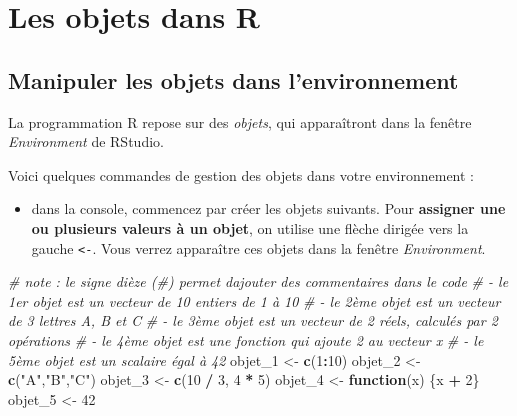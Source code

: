 \documentclass[
]{book}
\newenvironment{Shaded}{\begin{snugshade}}{\end{snugshade}}
\newcommand{\CommentTok}[1]{\textcolor[rgb]{0.56,0.35,0.01}{\textit{#1}}}
\newcommand{\ControlFlowTok}[1]{\textcolor[rgb]{0.13,0.29,0.53}{\textbf{#1}}}
\newcommand{\DecValTok}[1]{\textcolor[rgb]{0.00,0.00,0.81}{#1}}
\newcommand{\FunctionTok}[1]{\textcolor[rgb]{0.13,0.29,0.53}{\textbf{#1}}}
\newcommand{\NormalTok}[1]{#1}
\newcommand{\OtherTok}[1]{\textcolor[rgb]{0.56,0.35,0.01}{#1}}
\newcommand{\SpecialCharTok}[1]{\textcolor[rgb]{0.81,0.36,0.00}{\textbf{#1}}}
\newcommand{\StringTok}[1]{\textcolor[rgb]{0.31,0.60,0.02}{#1}}
\providecommand{\tightlist}{%
  \setlength{\itemsep}{0pt}\setlength{\parskip}{0pt}}
\begin{document}
\chapter{Les objets dans R}\label{les-objets-dans-r}

\section{Manipuler les objets dans l'environnement}\label{manipuler-les-objets-dans-lenvironnement}

La programmation R repose sur des \emph{objets}, qui apparaîtront dans la fenêtre \emph{Environment} de RStudio.

Voici quelques commandes de gestion des objets dans votre environnement :

\begin{itemize}
\tightlist
\item
  dans la console, commencez par créer les objets suivants. Pour \textbf{assigner une ou plusieurs valeurs à un objet}, on utilise une flèche dirigée vers la gauche \texttt{\textless{}-}. Vous verrez apparaître ces objets dans la fenêtre \emph{Environment}.
\end{itemize}

\begin{Shaded}
\begin{Highlighting}[]
\CommentTok{\# note : le signe dièze (\#) permet d\textquotesingle{}ajouter des commentaires dans le code  }
\CommentTok{\# {-} le 1er objet est un vecteur de 10 entiers de 1 à 10}
\CommentTok{\# {-} le 2ème objet est un vecteur de 3 lettres A, B et C}
\CommentTok{\# {-} le 3ème objet est un vecteur de 2 réels, calculés par 2 opérations}
\CommentTok{\# {-} le 4ème objet est une fonction qui ajoute 2 au vecteur x}
\CommentTok{\# {-} le 5ème objet est un scalaire égal à 42}
\NormalTok{objet\_1 }\OtherTok{\textless{}{-}} \FunctionTok{c}\NormalTok{(}\DecValTok{1}\SpecialCharTok{:}\DecValTok{10}\NormalTok{) }
\NormalTok{objet\_2 }\OtherTok{\textless{}{-}} \FunctionTok{c}\NormalTok{(}\StringTok{"A"}\NormalTok{,}\StringTok{"B"}\NormalTok{,}\StringTok{"C"}\NormalTok{) }
\NormalTok{objet\_3 }\OtherTok{\textless{}{-}} \FunctionTok{c}\NormalTok{(}\DecValTok{10} \SpecialCharTok{/} \DecValTok{3}\NormalTok{, }\DecValTok{4} \SpecialCharTok{*} \DecValTok{5}\NormalTok{) }
\NormalTok{objet\_4 }\OtherTok{\textless{}{-}} \ControlFlowTok{function}\NormalTok{(x) \{x }\SpecialCharTok{+} \DecValTok{2}\NormalTok{\} }
\NormalTok{objet\_5 }\OtherTok{\textless{}{-}} \DecValTok{42} 
\end{Highlighting}
\end{Shaded}
\end{document}
